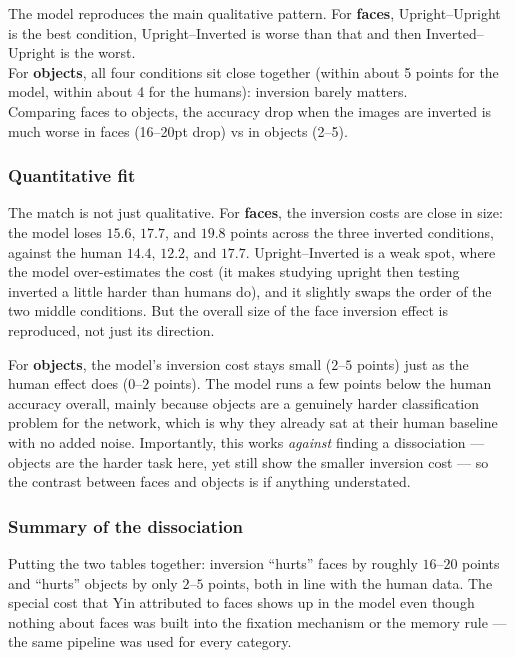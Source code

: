 \documentclass[11pt]{article}
\begin{document}
The model reproduces the main qualitative pattern. For \textbf{faces}, Upright--Upright is the
best condition, Upright--Inverted is worse than that and then Inverted--Upright is the worst.\\
For \textbf{objects}, all four conditions sit close together (within about 5 points for the model,
within about 4 for the humans): inversion barely matters. \\
Comparing faces to objects, the accuracy drop when the images are inverted is much worse in faces (16--20pt drop) vs in objects (2--5).

\subsubsection*{Quantitative fit}

The match is not just qualitative. For \textbf{faces}, the inversion costs are close in size: the model
loses $15.6$, $17.7$, and $19.8$ points across the three inverted conditions, against the
human $14.4$, $12.2$, and $17.7$. Upright--Inverted is a weak spot, where the model over-estimates the cost (it makes studying
upright then testing inverted a little harder than humans do), and it slightly swaps the order
of the two middle conditions. But the overall size of the face inversion effect is reproduced,
not just its direction.

For \textbf{objects}, the model's inversion cost stays small ($2$--$5$ points) just as the human effect
does ($0$--$2$ points). The model runs a few points below the human accuracy overall, mainly
because objects are a genuinely harder classification problem for the network, which is why
they already sat at their human baseline with no added noise. Importantly, this works
\emph{against} finding a dissociation --- objects are the harder task here, yet still show the
smaller inversion cost --- so the contrast between faces and objects is if anything
understated.

\subsubsection*{Summary of the dissociation}

Putting the two tables together: inversion ``hurts'' faces by roughly $16$--$20$ points and
``hurts'' objects by only $2$--$5$ points, both in line with the human data. The special cost
that Yin attributed to faces shows up in the model even though nothing about faces was built
into the fixation mechanism or the memory rule --- the same pipeline was used for every
category.
\end{document}
